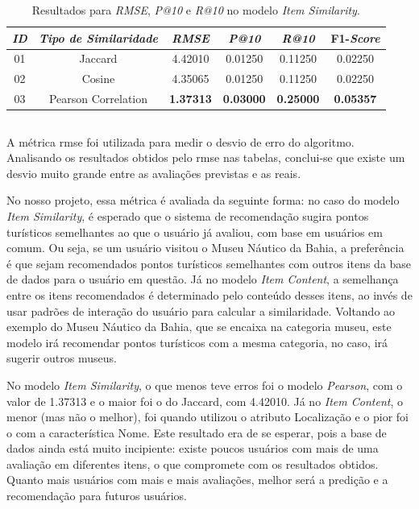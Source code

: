 \begin{table}[H]
    \centering
    \caption{Resultados para \textit{RMSE}, \textit{P@10} e \textit{R@10} no modelo \textit{Item Similarity}.}
    \label{tab:results_item_similarity}
    \begin{tabular}{|c|c|c|c|c|c|}
        \hline
        \textit{ID} & 
        \textit{Tipo de Similaridade} & 
        \textit{RMSE} & 
        \textit{P@10} & \textit{R@10} & F1-\textit{Score} \\ \hline
        01 & Jaccard & 4.42010 & 0.01250 & 0.11250 & 0.02250 \\ \hline
        02 & Cosine & 4.35065 & 0.01250 & 0.11250 & 0.02250 \\ \hline
        03 & Pearson Correlation & \textbf{1.37313} & \textbf{0.03000} & \textbf{0.25000} & \textbf{0.05357} \\ \hline
    \end{tabular}
\end{table}

\subsection{}

A métrica \acl{rmse} foi utilizada para medir o desvio de erro do algoritmo. Analisando os resultados obtidos pelo \ac{rmse} nas tabelas, conclui-se que existe um desvio muito grande entre as avaliações previstas e as reais.

No nosso projeto, essa métrica é avaliada da seguinte forma: no caso do modelo \textit{Item Similarity}, é esperado que o sistema de recomendação sugira pontos turísticos semelhantes ao que o usuário já avaliou, com base em usuários em comum. Ou seja, se um usuário visitou o Museu Náutico da Bahia, a preferência é que sejam recomendados pontos turísticos semelhantes com outros itens da base de dados para o usuário em questão. Já no modelo \textit{Item Content}, a semelhança entre os itens recomendados é determinado pelo conteúdo desses itens, ao invés de usar padrões de interação do usuário para calcular a similaridade. Voltando ao exemplo do Museu Náutico da Bahia, que se encaixa na categoria museu, este modelo irá recomendar pontos turísticos com a mesma categoria, no caso, irá sugerir outros museus.

No modelo \textit{Item Similarity}, o que menos teve erros foi o modelo \textit{Pearson}, com o valor de 1.37313 e o maior foi o do Jaccard, com 4.42010. Já no \textit{Item Content}, o menor (mas não o melhor), foi quando utilizou o atributo Localização e o pior foi o com a característica Nome. Este resultado era de se esperar, pois a base de dados ainda está muito incipiente: existe poucos usuários com mais de uma avaliação em diferentes itens, o que compromete com os resultados obtidos. Quanto mais usuários com mais e mais avaliações, melhor será a predição e a recomendação para futuros usuários.

